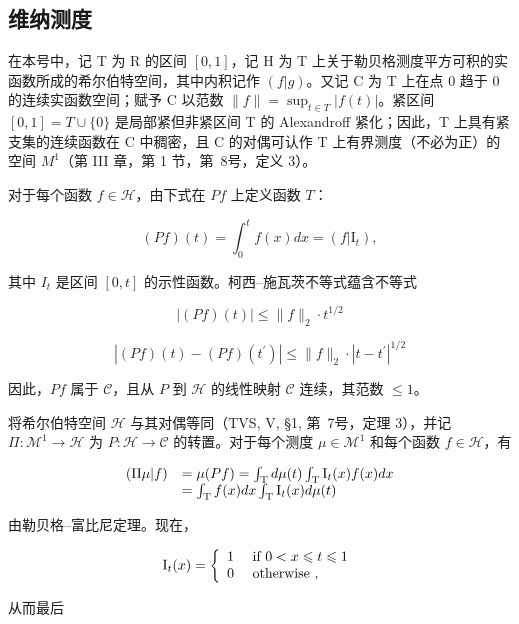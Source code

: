 \subsection{维纳测度}

在本号中，记 T 为 R 的区间 \([0,1]\)，记 H 为 T 上关于勒贝格测度平方可积的实函数所成的希尔伯特空间，其中内积记作 \((f|g)\)。又记 C 为 T 上在点 0 趋于 0 的连续实函数空间；赋予 C 以范数 \(\|f\| = \sup_{t \in T} |f(t)|\)。紧区间 \([0,1] = T \cup \{0\}\) 是局部紧但非紧区间 T 的 Alexandroff 紧化；因此，T 上具有紧支集的连续函数在 C 中稠密，且 C 的对偶可认作 T 上有界测度（不必为正）的空间 \(M^{1}\)（第 III 章，第 1 节，第~8号，定义 3）。

对于每个函数 \(f \in \mathcal{H}\)，由下式在 \(Pf\) 上定义函数 \(T\)：

\[
(P f) (t) = \int_ {0} ^ {t} f (x) d x = (f | \mathrm{I} _ {t}),\tag{31}
\]

其中 \(I_{t}\) 是区间 \([0, t]\) 的示性函数。柯西--施瓦茨不等式蕴含不等式

\[
| (P f) (t) | \leqslant \| f \| _ {2} \cdot t ^ {1 / 2}\tag{32}
\]

\[
\left| (P f) (t) - (P f) \left(t ^ {\prime}\right) \right| \leqslant \| f \| _ {2} \cdot \left| t - t ^ {\prime} \right| ^ {1 / 2}\tag{33}
\]

因此，\(Pf\) 属于 \(\mathcal{C}\)，且从 \(P\) 到 \(\mathcal{H}\) 的线性映射 \(\mathcal{C}\) 连续，其范数 \(\leqslant 1\)。

将希尔伯特空间 \(\mathcal{H}\) 与其对偶等同（TVS, V, §1, 第~7号，定理 3），并记 \(\Pi : \mathcal{M}^1 \to \mathcal{H}\) 为 \(P: \mathcal{H} \to \mathcal{C}\) 的转置。对于每个测度 \(\mu \in \mathcal{M}^1\) 和每个函数 \(f \in \mathcal{H}\)，有

\[
\begin{array}{r l} (\Pi \mu | f) & = \mu (P f) = \int_ {\mathrm{T}} d \mu (t) \int_ {\mathrm{T}} \mathrm{I} _ {t} (x) f (x) d x \\ & = \int_ {\mathrm{T}} f (x) d x \int_ {\mathrm{T}} \mathrm{I} _ {t} (x) d \mu (t) \end{array}
\]

由勒贝格--富比尼定理。现在，

\[
\mathrm{I} _ {t} (x) = \left\{ \begin{array}{l l} 1 & \text { if } 0 <   x \leqslant t \leqslant 1 \\ 0 & \text { otherwise }, \end{array} \right.
\]

从而最后

